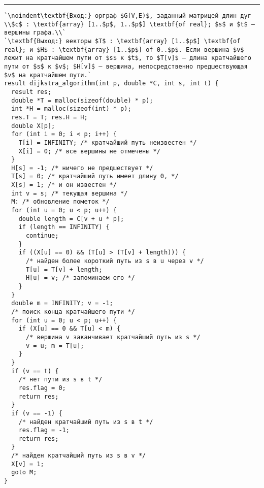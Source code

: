 \vspace{5pt} \hrule
\begin{lstlisting}[caption={Алгоритм Дейкстры}, label=p286_dijkstra_1, escapechar=`]
`\noindent\textbf{Вход:} орграф $G(V,E)$, заданный матрицей длин дуг \\$c$ : \textbf{array} [1..$p$, 1..$p$] \textbf{of real}; $s$ и $t$ — вершины графа.\\`
`\textbf{Выход:} векторы $T$ : \textbf{array} [1..$p$] \textbf{of real}; и $H$ : \textbf{array} [1..$p$] of 0..$p$. Если вершина $v$ лежит на кратчайшем пути от $s$ к $t$, то $T[v]$ — длина кратчайшего пути от $s$ к $v$; $H[v]$ — вершина, непосредственно предшествующая $v$ на кратчайшем пути.`
result dijkstra_algorithm(int p, double *C, int s, int t) {
  result res;
  double *T = malloc(sizeof(double) * p);
  int *H = malloc(sizeof(int) * p);
  res.T = T; res.H = H;
  double X[p];
  for (int i = 0; i < p; i++) {
    T[i] = INFINITY; /* кратчайший путь неизвестен */
    X[i] = 0; /* все вершины не отмечены */
  }
  H[s] = -1; /* ничего не предшествует */
  T[s] = 0; /* кратчайший путь имеет длину 0, */
  X[s] = 1; /* и он известен */
  int v = s; /* текущая вершина */
  M: /* обновление пометок */
  for (int u = 0; u < p; u++) {
    double length = C[v + u * p];
    if (length == INFINITY) {
      continue;
    }
    if ((X[u] == 0) && (T[u] > (T[v] + length))) {
      /* найден более короткий путь из s в u через v */
      T[u] = T[v] + length;
      H[u] = v; /* запоминаем его */
    }
  }
  double m = INFINITY; v = -1;
  /* поиск конца кратчайшего пути */
  for (int u = 0; u < p; u++) {
    if (X[u] == 0 && T[u] < m) {
      /* вершина v заканчивает кратчайший путь из s */
      v = u; m = T[u];
    }
  }
  if (v == t) {
    /* нет пути из s в t */
    res.flag = 0;
    return res;
  }
  if (v == -1) {
    /* найден кратчайший путь из s в t */
    res.flag = -1;
    return res;
  }
  /* найден кратчайший путь из s в v */
  X[v] = 1;
  goto M;
}
\end{lstlisting}
